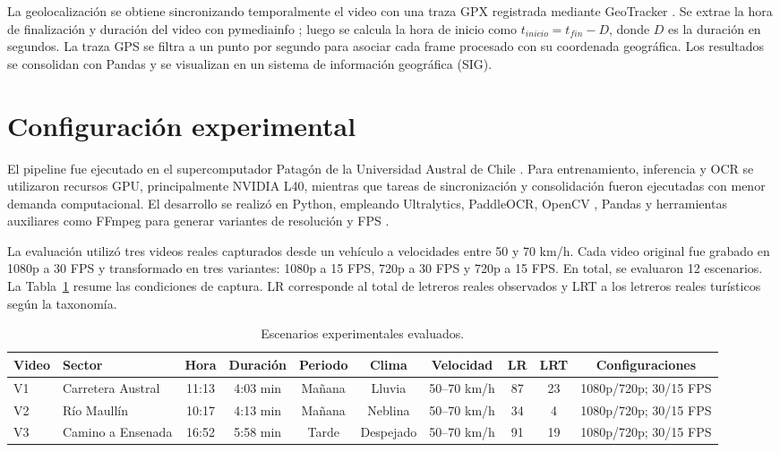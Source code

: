 \documentclass[conference]{IEEEtran}
\begin{document}
La geolocalización se obtiene sincronizando temporalmente el video con una
traza GPX registrada mediante GeoTracker \cite{geotracker}. Se extrae la 
hora de finalización y duración del video con pymediainfo
\cite{pymediainfo}; luego se calcula la hora de inicio 
como $t_{inicio}=t_{fin}-D$, donde $D$ es la duración en segundos. La 
traza GPS se filtra a un punto por segundo para asociar cada frame 
procesado con su coordenada geográfica. Los resultados se consolidan con 
Pandas \cite{pandas} y se visualizan en un sistema de información geográfica (SIG).

\section{Configuración experimental}

El pipeline fue ejecutado en el supercomputador Patagón de la Universidad 
Austral de Chile \cite{patagon}. Para entrenamiento, inferencia y OCR se 
utilizaron recursos GPU, principalmente NVIDIA L40, mientras que tareas de 
sincronización y consolidación fueron ejecutadas con menor demanda 
computacional. El desarrollo se realizó en Python, empleando Ultralytics, 
PaddleOCR, OpenCV \cite{opencv}, Pandas y herramientas auxiliares como 
FFmpeg para generar variantes de resolución y FPS \cite{ffmpeg}.

La evaluación utilizó tres videos reales capturados desde un vehículo a 
velocidades entre 50 y 70 km/h. Cada video original fue grabado en 1080p 
a 30 FPS y transformado en tres variantes: 1080p a 15 FPS, 720p a 30 FPS y 
720p a 15 FPS. En total, se evaluaron 12 escenarios. La 
Tabla~\ref{tab:escenarios} resume las condiciones de captura. LR 
corresponde al total de letreros reales observados y LRT a los letreros 
reales turísticos según la taxonomía.

\begin{table}[!t]
\caption{Escenarios experimentales evaluados.}
\label{tab:escenarios}
\centering
\footnotesize
\begin{tabular}{llcccccccc}
\toprule
Video & Sector & Hora & Duración & Periodo & Clima & Velocidad & LR & LRT & Configuraciones \\
\midrule
V1 & Carretera Austral & 11:13 & 4:03 min & Mañana & Lluvia & 50--70 km/h & 87 & 23 & 1080p/720p; 30/15 FPS \\
V2 & Río Maullín & 10:17 & 4:13 min & Mañana & Neblina & 50--70 km/h & 34 & 4 & 1080p/720p; 30/15 FPS \\
V3 & Camino a Ensenada & 16:52 & 5:58 min & Tarde & Despejado & 50--70 km/h & 91 & 19 & 1080p/720p; 30/15 FPS \\
\bottomrule
\end{tabular}
\end{table}
\end{document}
